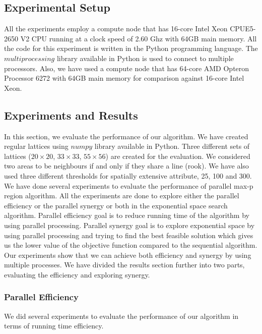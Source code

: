 \documentclass[conference]{IEEEtran}
\begin{document}
\subsection{Experimental Setup}
All the experiments employ a compute node that has 16-core Intel Xeon
CPUE5-2650 V2 CPU running at a clock speed of 2.60 Ghz with 64GB main memory.
All the code for this experiment is written in the Python programming language.
The $multiprocessing$ library available in Python is used to connect to multiple
processors. Also, we have used a compute node that has 64-core AMD Opteron
Processor 6272 with 64GB main memory for comparison against 16-core Intel Xeon.

\subsection{Experiments and Results}

In this section, we evaluate the performance of our algorithm. We have created
regular lattices using $numpy$ library available in Python. Three different sets
of lattices ($20\times 20$, $33\times 33$, $55\times 56$) are created for the
evaluation. We considered two areas to be neighbours if and only if they share a
line (rook). We have also used three different thresholds for spatially
extensive attribute, 25, 100 and 300. We have done several experiments to
evaluate the performance of parallel max-p region algorithm. All the experiments are done to explore either the parallel efficiency or the parallel synergy or both in the exponential space search algorithm. Parallel efficiency goal is to reduce running time of the algorithm by using parallel processing. Parallel synergy goal is to explore exponential space by using parallel processing and trying to find the best feasible solution which gives us the lower value of the objective function compared to the sequential algorithm. Our experiments show that we can achieve both efficiency and synergy by using multiple processes. We have divided the results section further into two parts, evaluating the efficiency and exploring synergy.

\subsubsection{\textbf{Parallel Efficiency}}

We did several experiments to evaluate the performance of our algorithm in terms of running time efficiency. 

\end{document}
